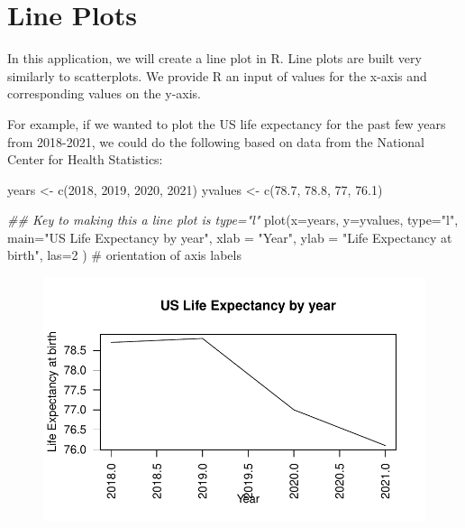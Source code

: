 \documentclass[
  letterpaper,
  DIV=11,
  numbers=noendperiod]{scrreprt}
\newenvironment{Shaded}{\begin{snugshade}}{\end{snugshade}}
\newcommand{\AttributeTok}[1]{\textcolor[rgb]{0.40,0.45,0.13}{#1}}
\newcommand{\CommentTok}[1]{\textcolor[rgb]{0.37,0.37,0.37}{#1}}
\newcommand{\DecValTok}[1]{\textcolor[rgb]{0.68,0.00,0.00}{#1}}
\newcommand{\DocumentationTok}[1]{\textcolor[rgb]{0.37,0.37,0.37}{\textit{#1}}}
\newcommand{\FloatTok}[1]{\textcolor[rgb]{0.68,0.00,0.00}{#1}}
\newcommand{\FunctionTok}[1]{\textcolor[rgb]{0.28,0.35,0.67}{#1}}
\newcommand{\NormalTok}[1]{\textcolor[rgb]{0.00,0.23,0.31}{#1}}
\newcommand{\OtherTok}[1]{\textcolor[rgb]{0.00,0.23,0.31}{#1}}
\newcommand{\StringTok}[1]{\textcolor[rgb]{0.13,0.47,0.30}{#1}}
\begin{document}
\hypertarget{line-plots}{%
\section{Line Plots}\label{line-plots}}

In this application, we will create a line plot in R. Line plots are
built very similarly to scatterplots. We provide R an input of values
for the x-axis and corresponding values on the y-axis.

For example, if we wanted to plot the US life expectancy for the past
few years from 2018-2021, we could do the following based on data from
the National Center for Health Statistics:

\begin{Shaded}
\begin{Highlighting}[]
\NormalTok{years }\OtherTok{\textless{}{-}} \FunctionTok{c}\NormalTok{(}\DecValTok{2018}\NormalTok{, }\DecValTok{2019}\NormalTok{, }\DecValTok{2020}\NormalTok{, }\DecValTok{2021}\NormalTok{)}
\NormalTok{yvalues }\OtherTok{\textless{}{-}} \FunctionTok{c}\NormalTok{(}\FloatTok{78.7}\NormalTok{, }\FloatTok{78.8}\NormalTok{, }\DecValTok{77}\NormalTok{, }\FloatTok{76.1}\NormalTok{)}

\DocumentationTok{\#\# Key to making this a line plot is type="l"}
\FunctionTok{plot}\NormalTok{(}\AttributeTok{x=}\NormalTok{years,}
     \AttributeTok{y=}\NormalTok{yvalues,}
     \AttributeTok{type=}\StringTok{"l"}\NormalTok{,}
     \AttributeTok{main=}\StringTok{"US Life Expectancy by year"}\NormalTok{,}
     \AttributeTok{xlab =} \StringTok{"Year"}\NormalTok{,}
     \AttributeTok{ylab =} \StringTok{"Life Expectancy at birth"}\NormalTok{,}
     \AttributeTok{las=}\DecValTok{2}\NormalTok{ ) }\CommentTok{\# orientation of axis labels}
\end{Highlighting}
\end{Shaded}

\begin{figure}[H]

{\centering \includegraphics{04-Visualization_files/figure-pdf/unnamed-chunk-27-1.pdf}

}

\end{figure}
\end{document}
